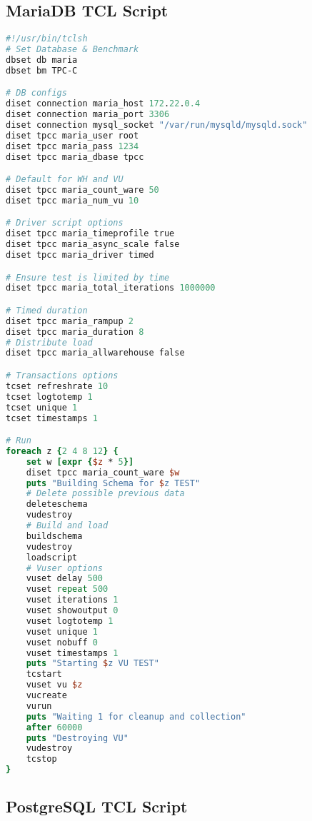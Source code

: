 \subsection{MariaDB TCL Script}
\label{sec:tcl-mariadb}

\begin{lstlisting}[language=Tcl, caption={TCL script for MariaDB}, label={lst:tcl-mariadb}]
#!/usr/bin/tclsh
# Set Database & Benchmark
dbset db maria
dbset bm TPC-C

# DB configs
diset connection maria_host 172.22.0.4
diset connection maria_port 3306
diset connection mysql_socket "/var/run/mysqld/mysqld.sock"
diset tpcc maria_user root
diset tpcc maria_pass 1234
diset tpcc maria_dbase tpcc

# Default for WH and VU
diset tpcc maria_count_ware 50
diset tpcc maria_num_vu 10

# Driver script options
diset tpcc maria_timeprofile true
diset tpcc maria_async_scale false
diset tpcc maria_driver timed

# Ensure test is limited by time
diset tpcc maria_total_iterations 1000000

# Timed duration
diset tpcc maria_rampup 2
diset tpcc maria_duration 8
# Distribute load
diset tpcc maria_allwarehouse false

# Transactions options
tcset refreshrate 10
tcset logtotemp 1
tcset unique 1
tcset timestamps 1

# Run
foreach z {2 4 8 12} {
    set w [expr {$z * 5}]
    diset tpcc maria_count_ware $w
    puts "Building Schema for $z TEST"
    # Delete possible previous data
    deleteschema
    vudestroy
    # Build and load
    buildschema
    vudestroy
    loadscript
    # Vuser options
    vuset delay 500
    vuset repeat 500
    vuset iterations 1
    vuset showoutput 0
    vuset logtotemp 1
    vuset unique 1
    vuset nobuff 0
    vuset timestamps 1
    puts "Starting $z VU TEST"
    tcstart
    vuset vu $z
    vucreate
    vurun
    puts "Waiting 1 for cleanup and collection"
    after 60000
    puts "Destroying VU"
    vudestroy
    tcstop
}
\end{lstlisting}

\pagebreak

\subsection{PostgreSQL TCL Script}
\label{sec:tcl-postgresql}

